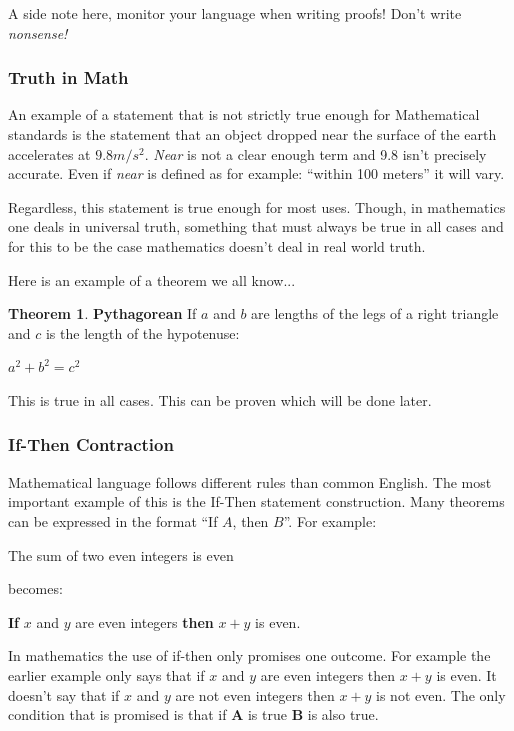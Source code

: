 \documentclass{article}
\theoremstyle{definition}
\newtheorem{thm}{Theorem}[section]
\theoremstyle{definition}
\begin{document}
A side note here, monitor your language when writing proofs! Don't write \textit{nonsense!}
\subsubsection*{Truth in Math}
An example of a statement that is not strictly true enough for Mathematical standards is
the statement that an object dropped near the surface of the earth accelerates at $9.8m/s^2$.
\textit{Near} is not a clear enough term and 9.8 isn't precisely accurate. Even
if \textit{near} is defined as for example: ``within 100 meters'' it will vary.


Regardless, this statement is true enough for most uses. Though, in mathematics one
deals in universal truth, something that must always be true in all cases and for this to
be the case mathematics doesn't deal in real world truth.

Here is an example of a theorem we all know...
\begin{thm}\textbf{Pythagorean}
    If $a$ and $b$ are lengths of the legs of a right triangle and $c$ is the 
    length of the hypotenuse: 
    \begin{center}
        $a^2 + b^2 = c^2$
    \end{center}
\end{thm}
This is true in all cases. This can be proven which will be done later.
\subsubsection*{If-Then Contraction}
Mathematical language follows different rules than common English.
The most important example of this is the If-Then statement construction.
Many theorems can be expressed in the format ``If $A$, then $B$''. For example:

\begin{center}
    The sum of two even integers is even 
\end{center}
becomes:

\begin{center}
    \textbf{If} $x$ and $y$ are even integers \textbf{then} $x + y$ is even. 
\end{center}
In mathematics the use of if-then only promises one outcome. For example the earlier
example only says that if $x$ and $y$ are even integers then $x + y$ is even. It
doesn't say that if $x$ and $y$ are not even integers then $x+y$ is not even.
The only condition that is promised is that if \textbf{A} is true \textbf{B} is also
true.
\bigbreak
\end{document}
